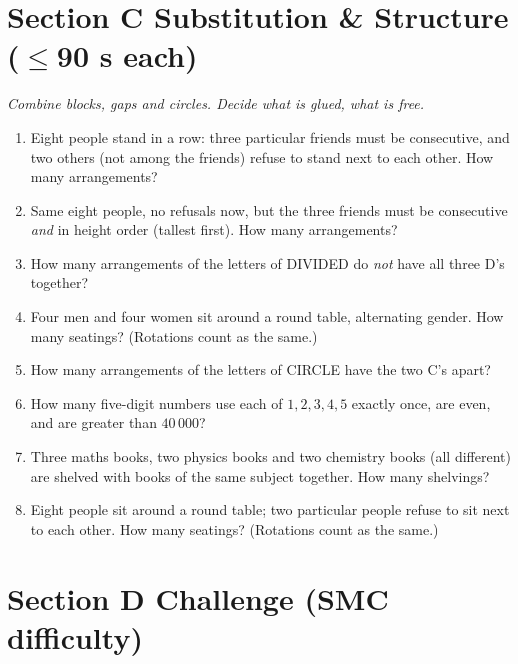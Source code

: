 \documentclass[11pt,a4paper]{article}
\begin{document}
\section*{Section C \quad Substitution \& Structure \hfill{\normalfont\small($\leq$90 s each)}}

\noindent\textit{Combine blocks, gaps and circles. Decide what is glued, what is free.}

\begin{enumerate}

\item Eight people stand in a row: three particular friends must be consecutive, and two others (not among the friends) refuse to stand next to each other. How many arrangements?

\item Same eight people, no refusals now, but the three friends must be consecutive \emph{and} in height order (tallest first). How many arrangements?

\item How many arrangements of the letters of DIVIDED do \emph{not} have all three D's together?

\item Four men and four women sit around a round table, alternating gender. How many seatings? (Rotations count as the same.)

\item How many arrangements of the letters of CIRCLE have the two C's apart?

\item How many five-digit numbers use each of $1,2,3,4,5$ exactly once, are even, and are greater than $40\,000$?

\item Three maths books, two physics books and two chemistry books (all different) are shelved with books of the same subject together. How many shelvings?

\item Eight people sit around a round table; two particular people refuse to sit next to each other. How many seatings? (Rotations count as the same.)

\end{enumerate}

\section*{Section D \quad Challenge \hfill{\normalfont\small(SMC difficulty)}}
\end{document}
